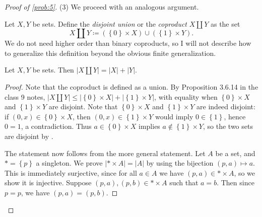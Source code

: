 \documentclass[11pt, letterpaper]{article}
\theoremstyle{definition}
\begin{document}
\begin{proof}[Proof of \cref{prob:5}]
	(3) We proceed with an analogous argument.
	\begin{definition}\label{dfn:4}
		Let $X,Y$ be sets. Define the \emph{disjoint union} or the \emph{coproduct} $X\amalg Y$ as the set
		\[
			X \amalg Y \coloneqq (\left\{ 0 \right\} \times X) \cup (\left\{ 1 \right\} \times Y)
		.\]
		We do not need higher order than binary coproducts, so I will not describe how to generalize this definition beyond the obvious finite generalization.
	\end{definition}
	\begin{lemma}\label{lma:5-7}
		Let $X,Y$ be sets. Then $\left| X\amalg Y \right| =\left| X \right| +\left| Y \right| $.
	\end{lemma}
	\begin{proof}
		Note that the coproduct is defined as a union. By Proposition 3.6.14 in the class 9 notes, $\left| X\amalg Y \right| \leq \left| \left\{ 0 \right\} \times X \right| + \left| \left\{ 1 \right\} \times Y \right|$, with equality when $\left\{ 0 \right\} \times X$ and $\left\{ 1 \right\} \times Y$ are disjoint. Note that $\left\{ 0 \right\} \times X$ and $\left\{ 1 \right\} \times Y$ are indeed disjoint: if $(0,x)\in \left\{ 0 \right\} \times X$, then $(0,x)\in \left\{ 1 \right\} \times Y$ would imply $0\in \left\{ 1 \right\} $, hence $0=1$, a contradiction. Thus $a\in \left\{ 0 \right\} \times X$ implies $a\notin \left\{ 1 \right\} \times Y$, so the two sets are disjoint by \cite[Lemma~2.1]{hw2}.

		The statement now follows from the more general statement. Let $A$ be a set, and $* = \left\{ p \right\}$ a singleton. We prove $\left| * \times A \right| =\left| A \right| $ by using the bijection $(p,a)\mapsto a$. This is immediately surjective, since for all $a\in A$ we have $(p,a)\in *\times A$, so we show it is injective. Suppose $(p,a),(p,b)\in *\times A$ such that $a=b$. Then since $p=p$, we have $(p,a)=(p,b)$.


\end{proof}
\end{proof}
\end{document}
